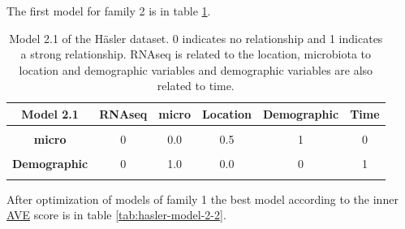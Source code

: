 \documentclass[
  12pt,
  a4paper,
  twoside,
  openright]{book}
\begin{document}
The first model for family 2 is in table \ref{tab:hasler-model-2-1}.

\begin{table}[H]

\caption[Model 2.1 of the Häsler dataset.]{\label{tab:hasler-model-2-1}Model 2.1 of the Häsler dataset. 0 indicates no relationship and 1 indicates a strong relationship. RNAseq is related to the location, microbiota to location and demographic variables and demographic variables are also related to time.}
\centering
\begin{tabular}[t]{>{}c|c|c|c|c|c}
\hline
\textbf{Model 2.1} & \textbf{RNAseq} & \textbf{micro} & \textbf{Location} & \textbf{Demographic} & \textbf{Time}\\
\hline
\textbf{\cellcolor{gray!6}{RNAseq}} & \cellcolor{gray!6}{0} & \cellcolor{gray!6}{0.0} & \cellcolor{gray!6}{1.0} & \cellcolor{gray!6}{0} & \cellcolor{gray!6}{0}\\
\hline
\textbf{micro} & 0 & 0.0 & 0.5 & 1 & 0\\
\hline
\textbf{\cellcolor{gray!6}{Location}} & \cellcolor{gray!6}{1} & \cellcolor{gray!6}{0.5} & \cellcolor{gray!6}{0.0} & \cellcolor{gray!6}{0} & \cellcolor{gray!6}{0}\\
\hline
\textbf{Demographic} & 0 & 1.0 & 0.0 & 0 & 1\\
\hline
\textbf{\cellcolor{gray!6}{Time}} & \cellcolor{gray!6}{0} & \cellcolor{gray!6}{0.0} & \cellcolor{gray!6}{0.0} & \cellcolor{gray!6}{1} & \cellcolor{gray!6}{0}\\
\hline
\end{tabular}
\end{table}

After optimization of models of family 1 the best model according to the inner \protect\hyperlink{acronyms_AVE}{AVE} score is in table \ref{tab:hasler-model-2-2}.
\end{document}
